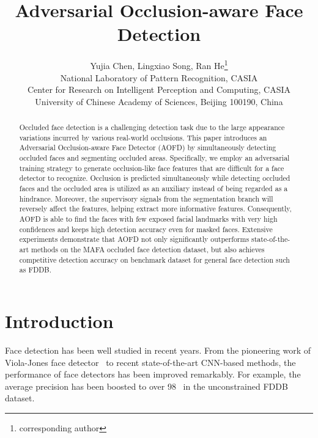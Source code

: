 \documentclass[10pt,twocolumn,letterpaper]{article}
\begin{document}
\title{Adversarial Occlusion-aware Face Detection}


\author{Yujia Chen, Lingxiao Song, Ran He\thanks{corresponding author}\\
National Laboratory of Pattern Recognition, CASIA\\
Center for Research on Intelligent Perception and Computing, CASIA\\
University of Chinese Academy of Sciences, Beijing 100190, China
}



\maketitle
\thispagestyle{fancy}



\begin{abstract}
Occluded face detection is a challenging detection task due to the large appearance variations incurred by various real-world occlusions. This paper introduces an Adversarial Occlusion-aware Face Detector (AOFD) by simultaneously detecting occluded faces and segmenting occluded areas. Specifically, we employ an adversarial training strategy to generate occlusion-like face features that are difficult for a face detector to recognize. Occlusion is predicted simultaneously while detecting occluded faces and the occluded area is utilized as an auxiliary instead of being regarded as a hindrance. Moreover, the supervisory signals from the segmentation branch will reversely affect the features, helping extract more informative features. Consequently, AOFD is able to find the faces with few exposed facial landmarks with very high confidences and keeps high detection accuracy even for masked faces. Extensive experiments demonstrate that AOFD not only significantly outperforms state-of-the-art methods on the MAFA occluded face detection dataset, but also achieves competitive detection accuracy on benchmark dataset for general face detection such as FDDB.
\end{abstract}



\section{Introduction}

Face detection has been well studied in recent years.
From the pioneering work of Viola-Jones face detector~\cite{viola2001rapid} to recent state-of-the-art CNN-based methods, the performance of face detectors has been improved remarkably. For example, the average precision has been boosted to over 98~\cite{hu2016tinyface,najibi2017ssh,zhang2017s3fd} in the unconstrained FDDB dataset.
\end{document}
